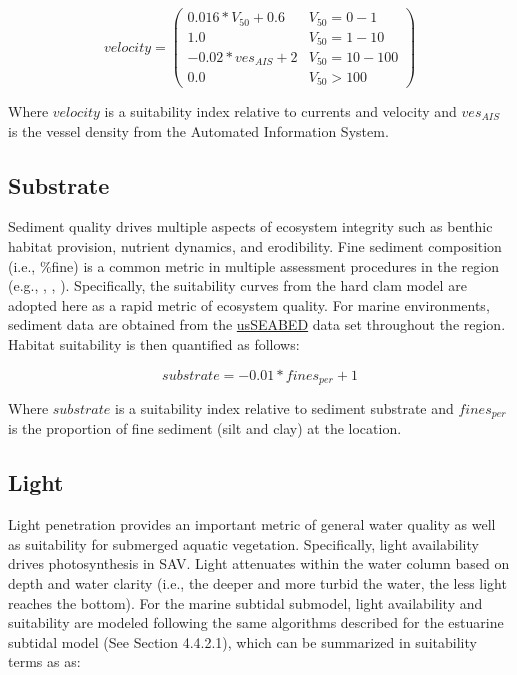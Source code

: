 \documentclass[
]{book}
\begin{document}
\[velocity = \begin{pmatrix} 0.016*V_{50}+0.6 & V_{50}=0-1\\
1.0 & V_{50}=1-10\\
-0.02*ves_{AIS}+2 & V_{50}=10-100\\
0.0 & V_{50}>100
\end{pmatrix}\]

Where \(velocity\) is a suitability index relative to currents and velocity and \(ves_{AIS}\) is the vessel density from the Automated Information System.

\hypertarget{substrate}{%
\subsection{Substrate}\label{substrate}}

Sediment quality drives multiple aspects of ecosystem integrity such as benthic habitat provision, nutrient dynamics, and erodibility. Fine sediment composition (i.e., \%fine) is a common metric in multiple assessment procedures in the region (e.g., \citet{mulholland_habitat_1984-1}, \citet{usace_new_2000}, \citet{USACE_port_2021}). Specifically, the suitability curves from the hard clam model \citep{mulholland_habitat_1984-1} are adopted here as a rapid metric of ecosystem quality. For marine environments, sediment data are obtained from the \href{https://www.usgs.gov/programs/cmhrp/science/accessing-usseabed}{usSEABED} data set throughout the region. Habitat suitability is then quantified as follows:

\[substrate = -0.01*fines_{per}+1\]

Where \(substrate\) is a suitability index relative to sediment substrate and \(fines_{per}\) is the proportion of fine sediment (silt and clay) at the location.

\hypertarget{light}{%
\subsection{Light}\label{light}}

Light penetration provides an important metric of general water quality as well as suitability for submerged aquatic vegetation. Specifically, light availability drives photosynthesis in SAV. Light attenuates within the water column based on depth and water clarity (i.e., the deeper and more turbid the water, the less light reaches the bottom). For the marine subtidal submodel, light availability and suitability are modeled following the same algorithms described for the estuarine subtidal model (See Section 4.4.2.1), which can be summarized in suitability terms as as:
\end{document}
